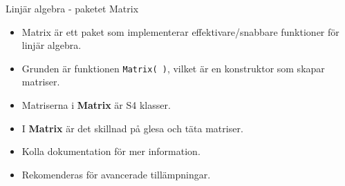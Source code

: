 \documentclass[
  11pt,
  ignorenonframetext,
  handout]{beamer}
\providecommand{\tightlist}{%
  \setlength{\itemsep}{0pt}\setlength{\parskip}{0pt}}
\begin{document}
\begin{frame}{Linjär algebra - paketet Matrix}
\protect\hypertarget{linjuxe4r-algebra---paketet-matrix}{}
\begin{itemize}
\tightlist
\item
  Matrix är ett paket som implementerar effektivare/snabbare funktioner
  för linjär algebra.
\item
  Grunden är funktionen \texttt{Matrix( )}, vilket är en konstruktor som
  skapar matriser.
\item
  Matriserna i \textbf{Matrix} är S4 klasser.
\item
  I \textbf{Matrix} är det skillnad på glesa och täta matriser.
\item
  Kolla dokumentation för mer information.
\item
  Rekomenderas för avancerade tillämpningar.
\end{itemize}
\end{frame}
\end{document}
